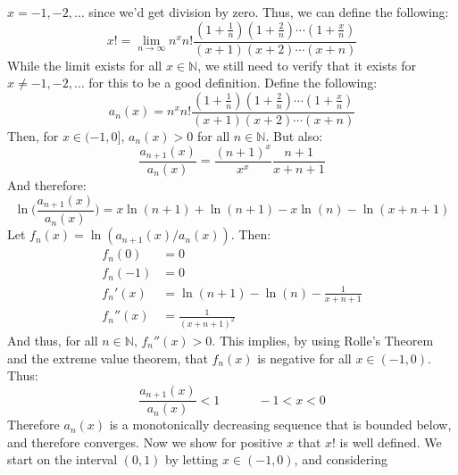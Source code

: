 \documentclass[crop=false,class=book,oneside]{standalone}
\begin{document}
        $x=\minus{1},\minus{2},\dots$ since we'd get division by zero.
        Thus, we can define the following:
        \begin{equation}
            x!=\underset{n\rightarrow\infty}{\lim}n^{x}n!
                \frac{(1+\frac{1}{n})(1+\frac{2}{n})\cdots(1+\frac{x}{n})}
                     {(x+1)(x+2)\cdots(x+n)}
        \end{equation}
        While the limit exists for all $x\in\mathbb{N}$, we still need to
        verify that it exists for $x\ne\minus{1},\minus{2},\dots$ for this
        to be a good definition. Define the following:
        \begin{equation}
            a_{n}(x)=n^{x}n!
                \frac{(1+\frac{1}{n})(1+\frac{2}{n})\cdots(1+\frac{x}{n})}
                     {(x+1)(x+2)\cdots(x+n)}
        \end{equation}
        Then, for $x\in(-1,0]$, $a_{n}(x)>0$ for all $n\in\mathbb{N}$.
        But also:
        \begin{equation}
            \frac{a_{n+1}(x)}{a_{n}(x)}=
            \frac{(n+1)^{x}}{x^{x}}\frac{n+1}{x+n+1}
        \end{equation}
        And therefore:
        \begin{equation}
            \ln\Big(\frac{a_{n+1}(x)}{a_{n}(x)}\Big)=
            x\ln(n+1)+\ln(n+1)-x\ln(n)-\ln(x+n+1)
        \end{equation}
        Let $f_{n}(x)=\ln(a_{n+1}(x)/a_{n}(x))$. Then:
        \begin{align}
            f_{n}(0)&=0\\
            f_{n}(-1)&=0\\
            f_{n}'(x)&=\ln(n+1)-\ln(n)-\frac{1}{x+n+1}\\
            f_{n}''(x)&=\frac{1}{(x+n+1)^{2}}
        \end{align}
        And thus, for all $n\in\mathbb{N}$, $f_{n}''(x)>0$.
        This implies, by using Rolle's Theorem and the extreme value
        theorem, that $f_{n}(x)$ is negative for all $x\in(-1,0)$.
        Thus:
        \begin{equation}
            \frac{a_{n+1}(x)}{a_{n}(x)}<1
            \quad\quad\quad
            \minus{1}<x<0
        \end{equation}
        Therefore $a_{n}(x)$ is a monotonically decreasing sequence
        that is bounded below, and therefore converges. Now we show for
        positive $x$ that $x!$ is well defined. We start on the interval
        $(0,1)$ by letting $x\in(\minus{1},0)$, and considering
\end{document}

